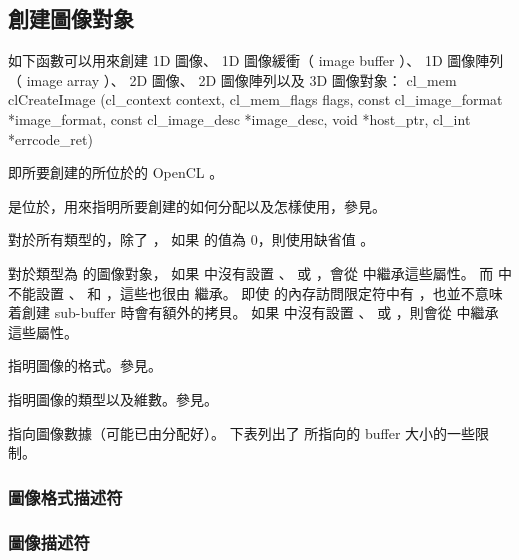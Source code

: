 \subsection{創建圖像對象}
如下函數可以用來創建 1D 圖像、 1D 圖像緩衝（ image buffer ）、 1D 圖像陣列（ image array ）、
2D 圖像、 2D 圖像陣列以及 3D 圖像對象：
\startclc
cl_mem clCreateImage (cl_context context,
		cl_mem_flags flags,
		const cl_image_format *image_format,
		const cl_image_desc *image_desc,
		void *host_ptr,
		cl_int *errcode_ret)
\stopclc

 即所要創建的所位於的 OpenCL 。

 是位於，用來指明所要創建的如何分配以及怎樣使用，參見。

對於所有類型的，除了 ，
如果  的值為 0，則使用缺省值 。

對於類型為  的圖像對象，
如果  中沒有設置 、  或 ，會從  中繼承這些屬性。
而  中不能設置 、  和 ，這些也很由  繼承。
即使  的內存訪問限定符中有 ，也並不意味着創建 sub-buffer 時會有額外的拷貝。
如果  中沒有設置 、  或 ，則會從  中繼承這些屬性。

 指明圖像的格式。參見。

 指明圖像的類型以及維數。參見。

 指向圖像數據（可能已由分配好）。
下表列出了  所指向的 buffer 大小的一些限制。



\subsubsection[tit:image format desc]{圖像格式描述符}

\subsubsection[tit:image desc]{圖像描述符}

